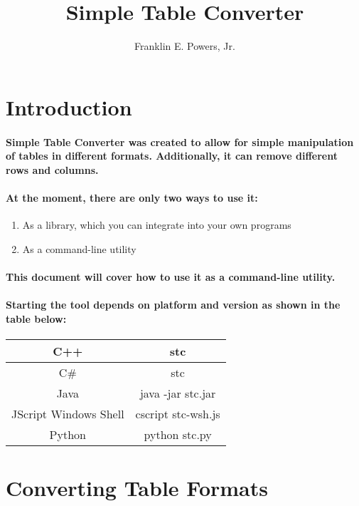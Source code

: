 \documentclass[11pt]{article}
\title{Simple Table Converter}
\author{Franklin E. Powers, Jr.}
\begin{document}
\maketitle

\section{Introduction}

\paragraph{Simple Table Converter was created to allow for simple manipulation of tables in different formats.  Additionally, it can remove different rows and columns.}
\paragraph{At the moment, there are only two ways to use it:}
\begin{enumerate}
    \item As a library, which you can integrate into your own programs
    \item As a command-line utility
\end{enumerate}
\paragraph{This document will cover how to use it as a command-line utility.}
\paragraph{Starting the tool depends on platform and version as shown in the table below:}

\begin{center}
\begin{tabular}{ | c | c | }
\hline
C++ & stc \\
\hline
C\# & stc \\
\hline
Java & java -jar stc.jar \\
\hline
JScript Windows Shell & cscript stc-wsh.js \\
\hline
Python & python stc.py \\
\hline
\end{tabular}
\end{center}

\section{Converting Table Formats}
\end{document}
